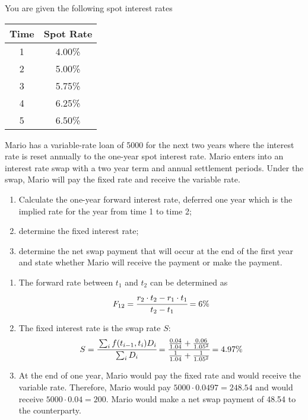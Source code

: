 \documentclass[12pt,a4paper]{exam}
\begin{document}
\begin{questions}
\question You are given the following spot interest rates
\begin{center}
\begin{tabular}{|c|c|}
\hline
Time & Spot Rate \\ \hline
1 & 4.00\% \\ \hline
2 & 5.00\% \\ \hline
3 & 5.75\% \\ \hline
4 & 6.25\% \\ \hline
5 & 6.50\% \\ \hline
\end{tabular}
\end{center}
Mario has a variable-rate loan of 5000 for the next two years where the interest rate is reset annually to the one-year spot interest rate. Mario enters into an interest rate swap with a two year term and annual settlement periods. Under the swap, Mario will pay the fixed rate and receive the variable rate.
\begin{enumerate}
\item Calculate the one-year forward interest rate, deferred one year which is the implied
rate for the year from time 1 to time 2;
\item determine the fixed interest rate;
\item determine the net swap payment that will occur at the end of the first year and state
whether Mario will receive the payment or make the payment.
\end{enumerate}

\fillwithlines{3cm}
\begin{solution}
\begin{enumerate}
\item The forward rate between $t_1$ and $t_2$ can be determined as
\begin{equation*}
F_{12} = \cfrac{r_2\cdot t_2 - r_1\cdot t_1}{t_2 - t_1} = 6\%
\end{equation*}
\item The fixed interest rate is the swap rate $S$:
\begin{equation*}
S = \cfrac{\sum_i f(t_{i-1}, t_i) D_i}{\sum_i D_i} = \cfrac{\frac{0.04}{1.04} + \frac{0.06}{1.05^2}}{\frac{1}{1.04}+\frac{1}{1.05^2}} = 4.97\%
\end{equation*}
\item At the end of one year, Mario would pay the fixed rate and would receive the variable rate. Therefore, Mario would pay $5000\cdot 0.0497 = 248.54$ and would receive $5000\cdot 0.04 = 200$. Mario would make a net swap payment of 48.54 to the counterparty.
\end{enumerate}
\end{solution}


\end{questions}
\end{document}
